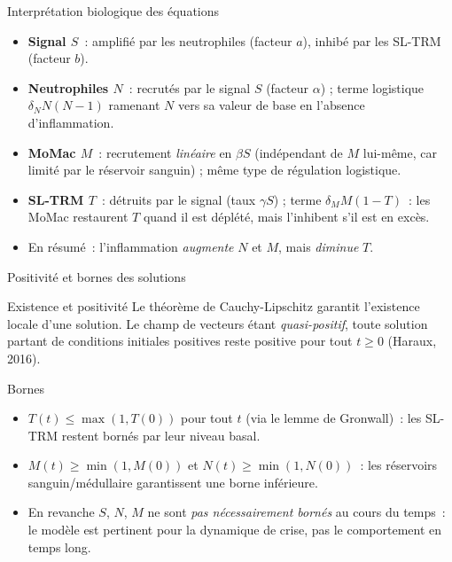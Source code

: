 \documentclass[aspectratio=169,12pt]{beamer}
\begin{document}
\begin{frame}{Interprétation biologique des équations}
\begin{itemize}
\item \textbf{Signal $S$}~: amplifié par les neutrophiles (facteur $a$), inhibé par les SL-TRM (facteur $b$).
\item \textbf{Neutrophiles $N$}~: recrutés par le signal $S$ (facteur $\alpha$) ; terme logistique $\delta_N N(N-1)$ ramenant $N$ vers sa valeur de base en l'absence d'inflammation.
\item \textbf{MoMac $M$}~: recrutement \emph{linéaire} en $\beta S$ (indépendant de $M$ lui-même, car limité par le réservoir sanguin) ; même type de régulation logistique.
\item \textbf{SL-TRM $T$}~: détruits par le signal (taux $\gamma S$) ; terme $\delta_M M (1-T)$~: les MoMac \alert{restaurent} $T$ quand il est déplété, mais l'\alert{inhibent} s'il est en excès.
\item En résumé~: l'inflammation \emph{augmente} $N$ et $M$, mais \emph{diminue} $T$.
\end{itemize}
\end{frame}

\begin{frame}{Positivité et bornes des solutions}
\begin{block}{Existence et positivité}
Le théorème de Cauchy-Lipschitz garantit l'existence locale d'une solution. Le champ de vecteurs étant \emph{quasi-positif}, toute solution partant de conditions initiales positives reste positive pour tout $t\geq 0$ (Haraux, 2016).
\end{block}
\begin{block}{Bornes}
\begin{itemize}
\item $T(t) \le \max(1, T(0))$ pour tout $t$ (via le lemme de Gronwall)~: les SL-TRM restent bornés par leur niveau basal.
\item $M(t) \ge \min(1, M(0))$ et $N(t) \ge \min(1, N(0))$~: les réservoirs sanguin/médullaire garantissent une borne inférieure.
\item En revanche $S$, $N$, $M$ ne sont \emph{pas nécessairement bornés} au cours du temps~: le modèle est pertinent pour la \alert{dynamique de crise}, pas le comportement en temps long.
\end{itemize}
\end{block}
\end{frame}

\end{document}

